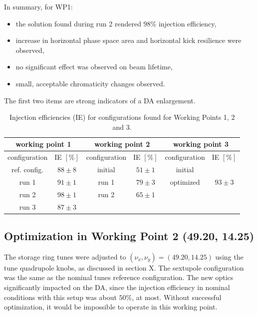 In summary, for WP1:
\begin{itemize}
    \item the solution found during run 2 rendered $98\%$ injection efficiency,
    \item increase in horizontal phase space area and horizontal kick resilience were observed,
    \item no significant effect was observed on beam lifetime,
    \item small, acceptable chromaticity changes observed.
\end{itemize}
The first two items are strong indicators of a DA enlargement.
\begin{table}[tb]
    \caption{Injection efficiencies (IE) for configurations found for Working Points 1, 2 and 3.}
    \centering
    \begin{tabular}{cccccc}
    \hline
    \multicolumn{2}{c}{working point 1} & \multicolumn{2}{c}{working point 2}         & \multicolumn{2}{c}{working point 3}         \\ \hline
    configuration      & IE $[\%]$      & configuration        & IE $[\%]$            & configuration        & IE $[\%]$            \\ \hline
    ref. config.       & $88\pm8$       & initial              & $51\pm1$             & initial              &                      \\
    run 1              & $91\pm1$       & run 1                & $79\pm3$             & optimized            & $93\pm3$             \\
    run 2              & $98\pm1$       & run 2                & $65\pm1    $         &                      &                      \\
    run 3              & $87\pm3$       & \multicolumn{1}{l}{} & \multicolumn{1}{l}{} & \multicolumn{1}{l}{} & \multicolumn{1}{l}{} \\ \hline
    \end{tabular}
    \label{table1}
    \end{table}

\subsection{Optimization in Working Point 2 (49.20, 14.25)}
The storage ring tunes were adjusted to $(\nu_x, \nu_y)=(49.20, 14.25)$ using the tune quadrupole knobs, as discussed in section X. The sextupole configuration was the same as the nominal tunes reference configuration. The new optics significantly impacted on the DA, since the injection efficiency in nominal conditions with this setup was about $50\%$, at most. Without successful optimization, it would be impossible to operate in this working point.

